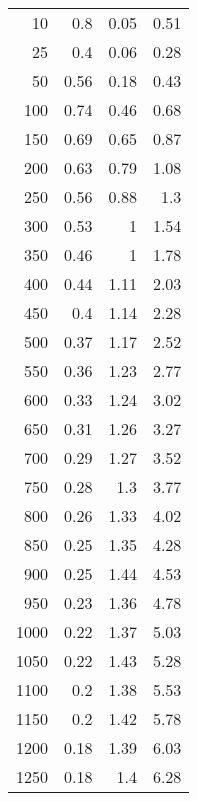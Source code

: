\begin{tabular}{rrrr}
\hline
   10 & 0.8  & 0.05 & 0.51 \\
   25 & 0.4  & 0.06 & 0.28 \\
   50 & 0.56 & 0.18 & 0.43 \\
  100 & 0.74 & 0.46 & 0.68 \\
  150 & 0.69 & 0.65 & 0.87 \\
  200 & 0.63 & 0.79 & 1.08 \\
  250 & 0.56 & 0.88 & 1.3  \\
  300 & 0.53 & 1    & 1.54 \\
  350 & 0.46 & 1    & 1.78 \\
  400 & 0.44 & 1.11 & 2.03 \\
  450 & 0.4  & 1.14 & 2.28 \\
  500 & 0.37 & 1.17 & 2.52 \\
  550 & 0.36 & 1.23 & 2.77 \\
  600 & 0.33 & 1.24 & 3.02 \\
  650 & 0.31 & 1.26 & 3.27 \\
  700 & 0.29 & 1.27 & 3.52 \\
  750 & 0.28 & 1.3  & 3.77 \\
  800 & 0.26 & 1.33 & 4.02 \\
  850 & 0.25 & 1.35 & 4.28 \\
  900 & 0.25 & 1.44 & 4.53 \\
  950 & 0.23 & 1.36 & 4.78 \\
 1000 & 0.22 & 1.37 & 5.03 \\
 1050 & 0.22 & 1.43 & 5.28 \\
 1100 & 0.2  & 1.38 & 5.53 \\
 1150 & 0.2  & 1.42 & 5.78 \\
 1200 & 0.18 & 1.39 & 6.03 \\
 1250 & 0.18 & 1.4  & 6.28 \\
\hline
\end{tabular}